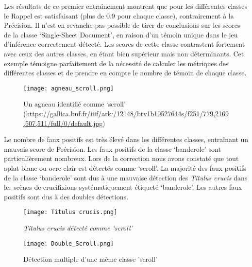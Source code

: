 \documentclass[12pt,twoside]{book}
\begin{document}
Les résultats de ce premier entraînement montrent que pour les différentes classes le Rappel est satisfaisant (plus de 0.9 pour chaque classe), contrairement à la Précision. Il n’est en revanche pas possible de tirer de conclusions sur les scores de la classe ‘Single-Sheet Document’, en raison d’un témoin unique dans le jeu d’inférence correctement détecté. Les scores de cette classe contrastent fortement avec ceux des autres classes, en étant bien supérieur mais non déterminants. Cet exemple témoigne parfaitement de la nécessité de calculer les métriques des différentes classes et de prendre en compte le nombre de témoin de chaque classe.

\newpage
\begin{figure}[ht]
    \centering
    \begin{minipage}[b]{0.45\textwidth}
        \centering
        \texttt{[image: agneau\_scroll.png]}
        \caption{Un agneau identifié comme ‘scroll’ (\url{https://gallica.bnf.fr/iiif/ark:/12148/btv1b10527644s/f251/779,2169,507,511/full/0/default.jpg})}
    \end{minipage}
\end{figure}



Le nombre de faux positifs est très élevé dans les différentes classes, entraînant un mauvais score de Précision.  Les faux positifs de la classe ‘banderole’ sont particulièrement nombreux. Lors de la correction nous avons constaté que tout aplat blanc ou ocre clair est détectés comme ‘scroll’.  La majorité des faux positifs de la classe ‘banderole’ sont dus à une mauvaise détection des \textit{Titulus crucis} dans les scènes de crucifixions systématiquement étiqueté ‘banderole’. Les autres faux positifs sont dus à des doubles détections. \\

\begin{figure}[ht]
    \centering
    \begin{minipage}[b]{0.45\textwidth}
        \centering
        \texttt{[image: Titulus crucis.png]}
        \caption{\textit{Titulus crucis détecté comme 'scroll'}}
    \end{minipage}
    \hfill
    \begin{minipage}[b]{0.45\textwidth}
        \centering
        \texttt{[image: Double\_Scroll.png]}
        \caption{Détection multiple d'une même classe 'scroll'}
    \end{minipage}
\end{figure}
\end{document}
